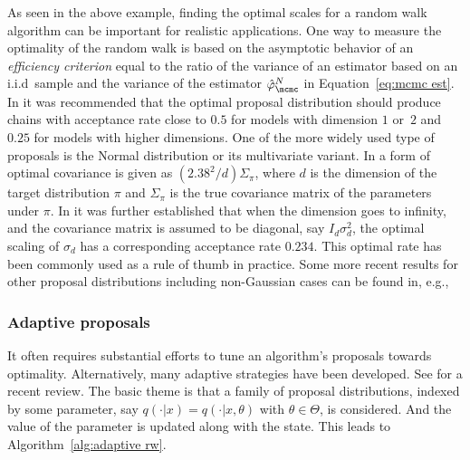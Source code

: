 As seen in the above example, finding the optimal scales for a random walk
algorithm can be important for realistic applications. One way to measure the
optimality of the random walk is based on the asymptotic behavior of an
\emph{efficiency criterion} equal to the ratio of the variance of an
estimator based on an i.i.d\ sample and the variance of the estimator
$\hat\varphi_{\mcmc}^N$ in Equation~\eqref{eq:mcmc est}. In
\cite{Roberts:1997dg} it was recommended that the optimal proposal
distribution should produce chains with acceptance rate close to $0.5$ for
models with dimension $1$ or~$2$ and~$0.25$ for models with higher
dimensions. One of the more widely used type of proposals is the Normal
distribution or its multivariate variant. In \cite{Gelman:1995vx} a form of
optimal covariance is given as $(2.38^2/d)\Sigma_{\pi}$, where $d$ is the
dimension of the target distribution $\pi$ and $\Sigma_{\pi}$ is the true
covariance matrix of the parameters under $\pi$. In \cite{Roberts:2001ta} it
was further established that when the dimension goes to infinity, and the
covariance matrix is assumed to be diagonal, say $I_d\sigma_d^2$, the optimal
scaling of $\sigma_d$ has a corresponding acceptance rate $0.234$. This
optimal rate has been commonly used as a rule of thumb in practice. Some more
recent results for other proposal distributions including non-Gaussian cases
can be found in, e.g., \cite{Chris:2009vx,Peter:2011vx}

\subsubsection{Adaptive proposals}
\label{ssub:Adaptive proposals}

It often requires substantial efforts to tune an algorithm's proposals towards
optimality. Alternatively, many adaptive strategies have been developed. See
\cite{Andrieu:2008kh} for a recent review. The basic theme is that a family of
proposal distributions, indexed by some parameter, say $q(\cdot|x) =
q(\cdot|x, \theta)$ with $\theta\in\Theta$, is considered. And the value of
the parameter is updated along with the state. This leads to
Algorithm~\ref{alg:adaptive rw}.



